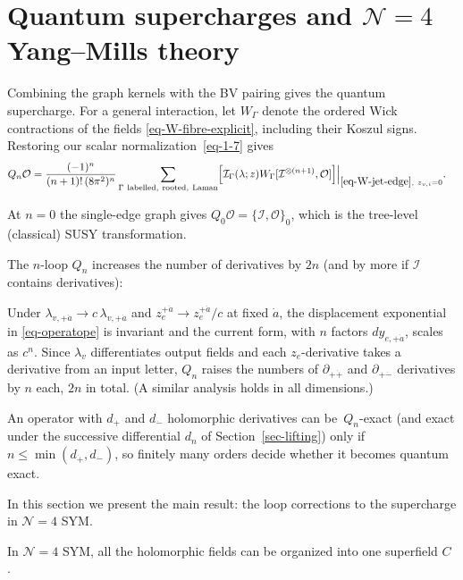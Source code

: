 \documentclass[11pt]{article}
\numberwithin{equation}{section}
\numberwithin{figure}{section}
\numberwithin{table}{section}
\begin{document}
\section{Quantum supercharges and $\mathcal N=4$ Yang--Mills theory}\label{sec-supercharge}

Combining the graph kernels with the BV pairing gives the quantum supercharge. For a general interaction, let $W_\Gamma$ denote the ordered Wick contractions of the fields \eqref{eq-W-fibre-explicit}, including their Koszul signs. Restoring our scalar normalization~\eqref{eq-1-7} gives
\begin{equation}\label{eq-2-3}
\begin{aligned}
Q_n\mathcal O
={}&\frac{(-1)^n}{(n+1)!\,(8\pi^2)^n}
\sum_{\substack{\Gamma\ \mathrm{labelled,\ rooted,\ Laman}}}
\Bigl[\mathcal I_\Gamma(\lambda;z)
W_\Gamma[\mathcal I^{\otimes(n+1)},\mathcal O]\Bigr]
\Big|_{\eqref{eq-W-jet-edge},\ z_{v,i}=0}.
\end{aligned}
\end{equation}

At $n=0$ the single-edge graph gives $Q_0\mathcal O=\{\mathcal I,\mathcal O\}_0$, which is the tree-level (classical) SUSY transformation.

The $n$-loop $Q_n$ increases the number of derivatives by $2n$ (and by more if $\mathcal I$ contains derivatives):~

Under $\lambda_{v,+\dot a}\to c\,\lambda_{v,+\dot a}$ and $z_e^{+\dot a}\to z_e^{+\dot a}/c$ at fixed $\dot a$, the displacement exponential in \eqref{eq-operatope} is invariant and the current form, with $n$ factors $dy_{e,+\dot a}$, scales as $c^n$. Since $\lambda_v$ differentiates output fields and each $z_e$-derivative takes a derivative from an input letter, $Q_n$ raises the numbers of $\partial_{+\dot+}$ and $\partial_{+\dot-}$ derivatives by $n$ each, $2n$ in total. (A similar analysis holds in all dimensions.)

An operator with $d_{\dot+}$ and $d_{\dot-}$ holomorphic derivatives can be~$Q_n$-exact (and exact under the successive differential $d_n$ of Section~\ref{sec-lifting}) only if~$n\le\min(d_{\dot+},d_{\dot-})$, so finitely many orders decide whether it becomes quantum exact.

In this section we present the main result: the loop corrections to the supercharge in $\mathcal N=4$ SYM.

In $\mathcal N=4$ SYM, all the holomorphic fields can be organized into one superfield $C$ \cite[Equation (3.52)]{BK}.
\end{document}
